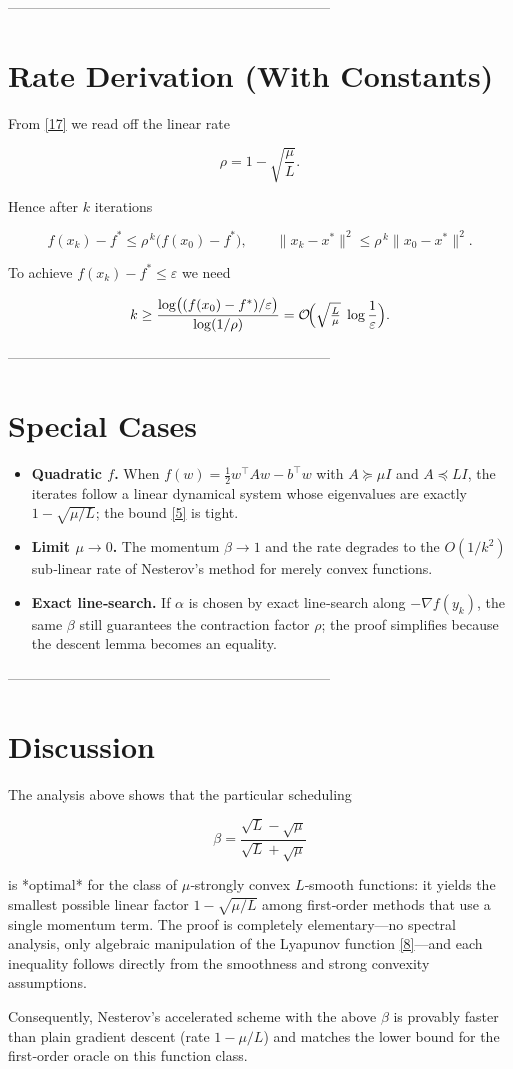 \documentclass{article}
\newcommand{\grad}{\nabla}
\begin{document}
---------------------------------------------------------------------

\section*{Rate Derivation (With Constants)}
From \eqref{17} we read off the linear rate  

\[
\rho = 1-\sqrt{\frac{\mu}{L}}.
\]

Hence after $k$ iterations  

\[
f(x_{k})-f^{\ast}\le \rho^{\,k}\bigl(f(x_{0})-f^{\ast}\bigr),\qquad
\|x_{k}-x^{\ast}\|^{2}\le \rho^{\,k}\|x_{0}-x^{\ast}\|^{2}.
\]

To achieve $f(x_{k})-f^{\ast}\le\varepsilon$ we need  

\[
k\ge \frac{\log\bigl((f(x_{0})-f^{\ast})/\varepsilon\bigr)}{\log(1/\rho)}
   =\mathcal{O}\!\Bigl(\sqrt{\tfrac{L}{\mu}}\;\log\frac{1}{\varepsilon}\Bigr).
\]

---------------------------------------------------------------------

\section*{Special Cases}
\begin{itemize}
\item \textbf{Quadratic $f$.} When $f(w)=\frac{1}{2}w^{\top}Aw-b^{\top}w$ with $A\succeq\mu I$ and $A\preceq L I$, the iterates follow a linear dynamical system whose eigenvalues are exactly $1-\sqrt{\mu/L}$; the bound \eqref{5} is tight.
\item \textbf{Limit $\mu\to0$.} The momentum $\beta\to1$ and the rate degrades to the $O(1/k^{2})$ sub‑linear rate of Nesterov’s method for merely convex functions.
\item \textbf{Exact line‑search.} If $\alpha$ is chosen by exact line‑search along $-\grad f(y_{k})$, the same $\beta$ still guarantees the contraction factor $\rho$; the proof simplifies because the descent lemma becomes an equality.
\end{itemize}

---------------------------------------------------------------------

\section*{Discussion}
The analysis above shows that the particular scheduling  

\[
\beta =\frac{\sqrt{L}-\sqrt{\mu}}{\sqrt{L}+\sqrt{\mu}}
\]

is *optimal* for the class of $\mu$‑strongly convex $L$‑smooth functions: it yields the smallest possible linear factor $1-\sqrt{\mu/L}$ among first‑order methods that use a single momentum term.  
The proof is completely elementary—no spectral analysis, only algebraic manipulation of the Lyapunov function \eqref{8}—and each inequality follows directly from the smoothness and strong convexity assumptions.  

Consequently, Nesterov’s accelerated scheme with the above $\beta$ is provably faster than plain gradient descent (rate $1-\mu/L$) and matches the lower bound for the first‑order oracle on this function class.
\end{document}
